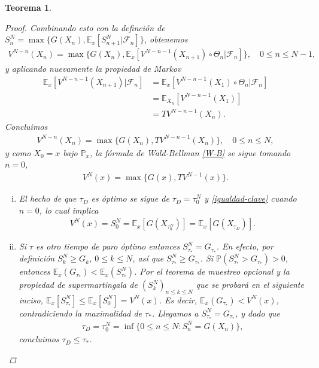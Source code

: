\documentclass{article}
\newtheorem{teorema}[theorem]{Teorema}
\numberwithin{equation}{section}
\begin{document}
\begin{teorema}
\begin{proof}
    Combinando esto con la definción de $S_n^N = \max\{G(X_n),\mathbb{E}_x\left[S_{n+1}^N | \mathcal{F}_n\right]\}$, obtenemos 
    \begin{align*}
    V^{N-n}(X_n) = \max\{G(X_n),\mathbb{E}_x\left[V^{N-n-1}(X_{n+1})\circ \Theta_n | \mathcal{F}_n\right]\}, \quad 0\leq n\leq N-1,
    \end{align*}
    y aplicando nuevamente la propiedad de Markov
    \begin{align*}
        \mathbb{E}_x\left[V^{N-n-1}(X_{n+1}) | \mathcal{F}_n\right] &= \mathbb{E}_x\left[V^{N-n-1}(X_{1})\circ\Theta_n | \mathcal{F}_n\right] \\
        &= \mathbb{E}_{X_n}\left[V^{N-n-1}(X_1)\right]\\
        &= TV^{N-n-1}(X_n).
    \end{align*}
Concluimos 
\begin{align*}
    V^{N-n}(X_n) = \max\{G(X_n),TV^{N-n-1}(X_n)\}, \quad 0\leq n \leq N,
\end{align*}
y como $X_0 = x$ bajo $\mathbb{P}_x$, la fórmula de Wald-Bellman \eqref{W-B} se sigue tomando $n=0$,
\begin{align*}
    V^{N}(x) = \max\{G(x),TV^{N-1}(x)\}.
\end{align*}

\begin{enumerate}[(i)]
    \item El hecho de que $\tau_D$ es óptimo se sigue de $\tau_D = \tau_0^N$  y  \eqref{igualdad-clave}  cuando $n=0$, lo cual implica
    \begin{align*}
        V^N(x) = S_0^N = \mathbb{E}_x\left[G(X_{\tau_0^N})\right] = \mathbb{E}_x\left[G(X_{\tau_D})\right].
    \end{align*}

    \item Si $\tau$ es otro tiempo de paro óptimo entonces $S_{\tau_*}^N = G_{\tau_*}$. En efecto, por definición $S^N_k \geq G_k$, $0\leq k\leq N$, así que $S^N_{\tau_*}\geq G_{\tau_*}$. Si $\mathbb{P}(S^N_{\tau_*}>G_{\tau_*})>0$, entonces $\mathbb{E}_x(G_{\tau_*})<\mathbb{E}_x(S^N_{\tau_*})$. Por el teorema de muestreo opcional y la propiedad de supermartingala de $(S^N_k)_{n\leq k\leq N}$  que se probará en el siguiente inciso, $ \mathbb{E}_x\left[S^N_{\tau_*}\right] \leq \mathbb{E}_x\left[S^N_0\right] = V^N(x)$. Es decir, $\mathbb{E}_x(G_{\tau_*})< V^N(x)$, contradiciendo la maximalidad de $\tau_*$. Llegamos a $S^N_{\tau_*}=G_{\tau_*}$, y dado que 
    \begin{align*}
    \tau_D = \tau_0^N= \inf\{0\leq n \leq N : S_n^N = G(X_n)\}, 
    \end{align*}
    concluimos $\tau_D \leq \tau_*$.
    

\end{enumerate}
\end{proof}
\end{teorema}
\end{document}
